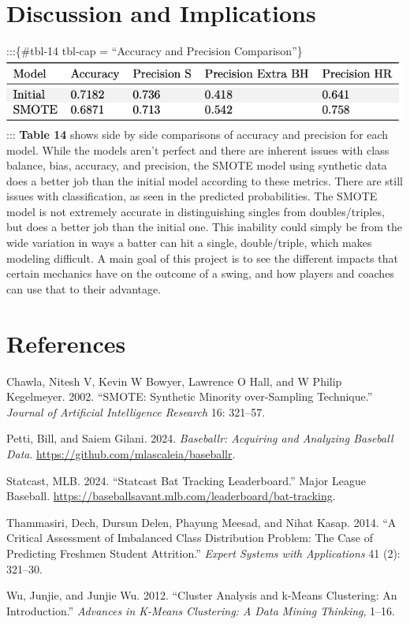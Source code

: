 \documentclass[
  letterpaper,
  DIV=11,
  numbers=noendperiod]{scrartcl}
\newlength{\cslhangindent}
\newenvironment{CSLReferences}[2] %
 {\begin{list}{}{%
  \setlength{\itemindent}{0pt}
  \setlength{\leftmargin}{0pt}
  \setlength{\parsep}{0pt}
  \ifodd #1
   \setlength{\leftmargin}{\cslhangindent}
   \setlength{\itemindent}{-1\cslhangindent}
  \fi
  \setlength{\itemsep}{#2\baselineskip}}}
 {\end{list}}
\begin{document}
\section{Discussion and Implications}\label{discussion-and-implications}

:::\{\#tbl-14 tbl-cap = ``Accuracy and Precision Comparison''\}
\includegraphics{./images/tables/tbl14.png} ::: \textbf{Table 14} shows
side by side comparisons of accuracy and precision for each model. While
the models aren't perfect and there are inherent issues with class
balance, bias, accuracy, and precision, the SMOTE model using synthetic
data does a better job than the initial model according to these
metrics. There are still issues with classification, as seen in the
predicted probabilities. The SMOTE model is not extremely accurate in
distinguishing singles from doubles/triples, but does a better job than
the initial one. This inability could simply be from the wide variation
in ways a batter can hit a single, double/triple, which makes modeling
difficult. A main goal of this project is to see the different impacts
that certain mechanics have on the outcome of a swing, and how players
and coaches can use that to their advantage.

\newpage

\section*{References}\label{references}

\label{refs}
\begin{CSLReferences}{1}{0}
Chawla, Nitesh V, Kevin W Bowyer, Lawrence O Hall, and W Philip
Kegelmeyer. 2002. {``SMOTE: Synthetic Minority over-Sampling
Technique.''} \emph{Journal of Artificial Intelligence Research} 16:
321--57.

Petti, Bill, and Saiem Gilani. 2024. \emph{Baseballr: Acquiring and
Analyzing Baseball Data}. \url{https://github.com/mlascaleia/baseballr}.

Statcast, MLB. 2024. {``Statcast Bat Tracking Leaderboard.''} Major
League Baseball.
\url{https://baseballsavant.mlb.com/leaderboard/bat-tracking}.

Thammasiri, Dech, Dursun Delen, Phayung Meesad, and Nihat Kasap. 2014.
{``A Critical Assessment of Imbalanced Class Distribution Problem: The
Case of Predicting Freshmen Student Attrition.''} \emph{Expert Systems
with Applications} 41 (2): 321--30.

Wu, Junjie, and Junjie Wu. 2012. {``Cluster Analysis and k-Means
Clustering: An Introduction.''} \emph{Advances in K-Means Clustering: A
Data Mining Thinking}, 1--16.

\end{CSLReferences}
\end{document}
